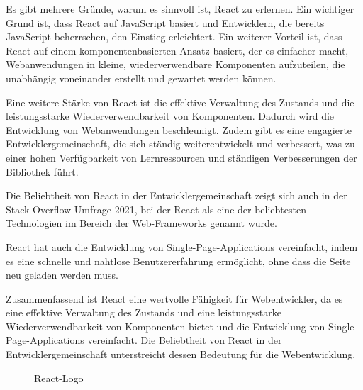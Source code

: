 Es gibt mehrere Gründe, warum es sinnvoll ist, React zu erlernen. Ein wichtiger Grund ist, dass React auf JavaScript basiert und Entwicklern, die bereits JavaScript beherrschen, den Einstieg erleichtert. Ein weiterer Vorteil ist, dass React auf einem komponentenbasierten Ansatz basiert, der es einfacher macht, Webanwendungen in kleine, wiederverwendbare Komponenten aufzuteilen, die unabhängig voneinander erstellt und gewartet werden können.\cite{Kinsta}

Eine weitere Stärke von React ist die effektive Verwaltung des Zustands und die leistungsstarke Wiederverwendbarkeit von Komponenten. Dadurch wird die Entwicklung von Webanwendungen beschleunigt. Zudem gibt es eine engagierte Entwicklergemeinschaft, die sich ständig weiterentwickelt und verbessert, was zu einer hohen Verfügbarkeit von Lernressourcen und ständigen Verbesserungen der Bibliothek führt.\cite{Kinsta}

Die Beliebtheit von React in der Entwicklergemeinschaft zeigt sich auch in der Stack Overflow Umfrage 2021, bei der React als eine der beliebtesten Technologien im Bereich der Web-Frameworks genannt wurde.\cite{StackOverflowSurvey}

React hat auch die Entwicklung von Single-Page-Applications vereinfacht, indem es eine schnelle und nahtlose Benutzererfahrung ermöglicht, ohne dass die Seite neu geladen werden muss.\cite{Kinsta}

Zusammenfassend ist React eine wertvolle Fähigkeit für Webentwickler, da es eine effektive Verwaltung des Zustands und eine leistungsstarke Wiederverwendbarkeit von Komponenten bietet und die Entwicklung von Single-Page-Applications vereinfacht. Die Beliebtheit von React in der Entwicklergemeinschaft unterstreicht dessen Bedeutung für die Webentwicklung.

\begin{figure}[htbp]
	\centering
	\caption{React-Logo}
\end{figure}

